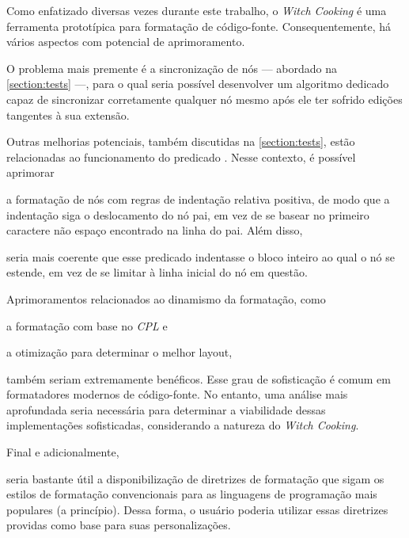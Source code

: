 \documentclass
  [11pt,a4paper,english,brazil,openright,sumario=tradicional,twoside]
  {abntex2}
\newcommand{\witchcooking}{\textit{Witch Cooking}\xspace}
\begin{document}
  Como enfatizado diversas vezes durante este trabalho, o \witchcooking é uma
  ferramenta prototípica para formatação de código-fonte. Consequentemente, há
  vários aspectos com potencial de aprimoramento.
  \begin{inparaenum}
    \item O problema mais premente é a sincronização de nós --- abordado na
          \cref{section:tests} ---, para o qual seria possível desenvolver um
          algoritmo dedicado capaz de sincronizar corretamente qualquer nó
          mesmo após ele ter sofrido edições tangentes à sua extensão.

          Outras melhorias potenciais, também discutidas na
          \cref{section:tests}, estão relacionadas ao funcionamento do
          predicado . Nesse contexto, é possível
          aprimorar
    \item a formatação de nós com regras de indentação relativa positiva, de
          modo que a indentação siga o deslocamento do nó pai, em vez de se
          basear no primeiro caractere não espaço encontrado na linha do pai.
          Além disso,
    \item seria mais coerente que esse predicado indentasse o bloco inteiro ao
          qual o nó se estende, em vez de se limitar à linha inicial do nó em
          questão.

    \item Aprimoramentos relacionados ao dinamismo da formatação, como
          \begin{inparaenum}
            \item a formatação com base no \textit{CPL} e
            \item a otimização para determinar o melhor layout,
          \end{inparaenum}
          também seriam extremamente benéficos. Esse grau de sofisticação é
          comum em formatadores modernos de código-fonte. No entanto, uma
          análise mais aprofundada seria necessária para determinar a
          viabilidade dessas implementações sofisticadas, considerando a
          natureza do \witchcooking.

          Final e adicionalmente,
    \item seria bastante útil a disponibilização de
          diretrizes de formatação que sigam os estilos de formatação
          convencionais para as linguagens de programação mais populares
          (a princípio). Dessa forma, o usuário poderia utilizar essas
          diretrizes providas como base para suas personalizações.
  \end{inparaenum}
\end{document}
